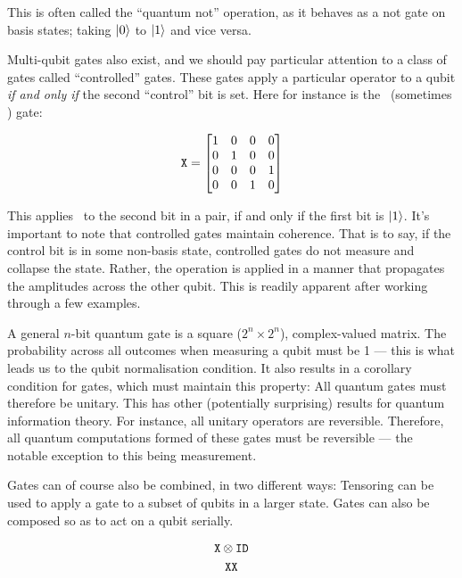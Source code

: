 \noindent This is often called the ``quantum not'' operation, as it behaves as a not gate on basis states; 
taking $\ket{0}$ to $\ket{1}$ and vice versa.

Multi-qubit gates also exist, and we should pay particular attention to a class of gates called ``controlled'' gates.
% 
These gates apply a particular operator to a qubit \emph{if and only if} the second ``control'' bit is set.
% 
Here for instance is the \CNOT\ (sometimes \CX) gate:

$$
\texttt{X} = \begin{bmatrix}
  1 & 0 & 0 & 0 \\
  0 & 1 & 0 & 0 \\
  0 & 0 & 0 & 1 \\
  0 & 0 & 1 & 0
\end{bmatrix}
$$

\noindent This applies \X\ to the second bit in a pair, if and only if the first bit is $\ket{1}$.
% 
It's important to note that controlled gates maintain coherence. 
% 
That is to say, if the control bit is in some non-basis state, controlled gates do not measure and collapse the state.
% 
Rather, the operation is applied in a manner that propagates the amplitudes across the other qubit. 
% 
This is readily apparent after working through a few examples.


A general $n$-bit quantum gate is a square ($2^n \times 2^n$), complex-valued matrix.
% 
The probability across all outcomes when measuring a qubit must be 1 --- 
this is what leads us to the qubit normalisation condition.
% 
It also results in a corollary condition for gates, which must maintain this property: 
All quantum gates must therefore be unitary. 
% 
This has other (potentially surprising) results for quantum information theory.
% 
For instance, all unitary operators are reversible. 
% 
Therefore, all quantum computations formed of these gates must be reversible --- 
the notable exception to this being measurement.


Gates can of course also be combined, in two different ways:
% 
Tensoring can be used to apply a gate to a subset of qubits in a larger state.
% 
Gates can also be composed so as to act on a qubit serially.


\begin{gather*}
    \X \otimes \texttt{ID} \\ %
    \X \X %
\end{gather*}


